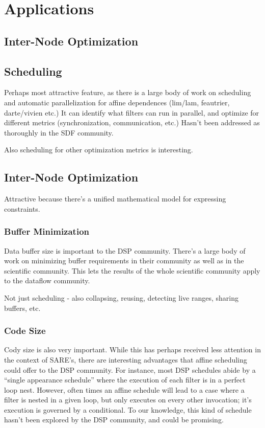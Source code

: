 \section{Applications}

\subsection{Inter-Node Optimization}

\subsection{Scheduling}

Perhaps most attractive feature, as there is a large body of work on
scheduling and automatic parallelization for affine dependences
(lim/lam, feautrier, darte/vivien etc.)  It can identify what filters
can run in parallel, and optimize for different metrics
(synchronization, communication, etc.)  Hasn't been addressed as
thoroughly in the SDF community.

Also scheduling for other optimization metrics is interesting.

\subsection{Inter-Node Optimization}

Attractive because there's a unified mathematical model for expressing
constraints.

\subsubsection{Buffer Minimization}

Data buffer size is important to the DSP community.  There's a large
body of work on minimizing buffer requirements in their community as
well as in the scientific community.  This lets the results of the
whole scientific community apply to the dataflow community.

Not just scheduling - also collapsing, reusing, detecting live ranges,
sharing buffers, etc.

\subsubsection{Code Size}

Cody size is also very important.  While this has perhaps received
less attention in the context of SARE's, there are interesting
advantages that affine scheduling could offer to the DSP community.
For instance, most DSP schedules abide by a ``single appearance
schedule'' where the execution of each filter is in a perfect loop
nest.  However, often times an affine schedule will lead to a case
where a filter is nested in a given loop, but only executes on every
other invocation; it's execution is governed by a conditional.  To our
knowledge, this kind of schedule hasn't been explored by the DSP
community, and could be promising.

